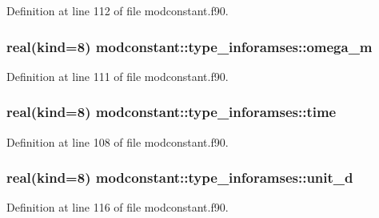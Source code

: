 Definition at line 112 of file modconstant.\+f90.

\subsubsection[{\texorpdfstring{omega\+\_\+m}{omega_m}}]{\setlength{\rightskip}{0pt plus 5cm}real(kind=8) modconstant\+::type\+\_\+inforamses\+::omega\+\_\+m}\hypertarget{structmodconstant_1_1type__inforamses_a57115a017792fc0c4a0f1c952e2efaa5}{}\label{structmodconstant_1_1type__inforamses_a57115a017792fc0c4a0f1c952e2efaa5}


Definition at line 111 of file modconstant.\+f90.

\subsubsection[{\texorpdfstring{time}{time}}]{\setlength{\rightskip}{0pt plus 5cm}real(kind=8) modconstant\+::type\+\_\+inforamses\+::time}\hypertarget{structmodconstant_1_1type__inforamses_ac8a308775ea0956bafceff96094d659d}{}\label{structmodconstant_1_1type__inforamses_ac8a308775ea0956bafceff96094d659d}


Definition at line 108 of file modconstant.\+f90.

\subsubsection[{\texorpdfstring{unit\+\_\+d}{unit_d}}]{\setlength{\rightskip}{0pt plus 5cm}real(kind=8) modconstant\+::type\+\_\+inforamses\+::unit\+\_\+d}\hypertarget{structmodconstant_1_1type__inforamses_a9bec2e4699094994b6802b7a63223c20}{}\label{structmodconstant_1_1type__inforamses_a9bec2e4699094994b6802b7a63223c20}


Definition at line 116 of file modconstant.\+f90.

